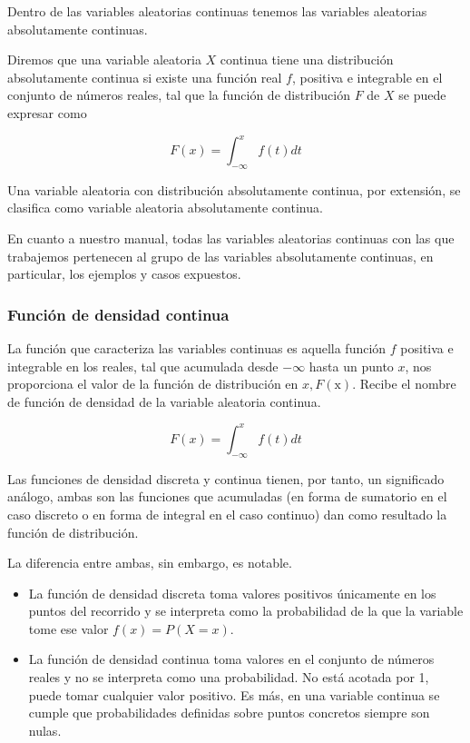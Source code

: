 \documentclass[
]{article}
\providecommand{\tightlist}{%
  \setlength{\itemsep}{0pt}\setlength{\parskip}{0pt}}
\begin{document}
Dentro de las variables aleatorias continuas tenemos las variables
aleatorias absolutamente continuas.

Diremos que una variable aleatoria \(X\) continua tiene una distribución
absolutamente continua si existe una función real \(f\), positiva e
integrable en el conjunto de números reales, tal que la función de
distribución \(F\) de \(X\) se puede expresar como

\[
F(x)=\int_{-\infty}^{x} f(t) d t
\]

Una variable aleatoria con distribución absolutamente continua, por
extensión, se clasifica como variable aleatoria absolutamente continua.

En cuanto a nuestro manual, todas las variables aleatorias continuas con
las que trabajemos pertenecen al grupo de las variables absolutamente
continuas, en particular, los ejemplos y casos expuestos.

\subsubsection{Función de densidad continua}\label{funciuxf3n-de-densidad-continua}

La función que caracteriza las variables continuas es aquella función
\(f\) positiva e integrable en los reales, tal que acumulada desde
\(-\infty\) hasta un punto \(x\), nos proporciona el valor de la función de
distribución en \(x, F(\mathrm{x})\). Recibe el nombre de función de
densidad de la variable aleatoria continua.

\[
F(x)=\int_{-\infty}^{x} f(t) d t
\]

Las funciones de densidad discreta y continua tienen, por tanto, un
significado análogo, ambas son las funciones que acumuladas (en forma de
sumatorio en el caso discreto o en forma de integral en el caso
continuo) dan como resultado la función de distribución.

La diferencia entre ambas, sin embargo, es notable.

\begin{itemize}
\tightlist
\item
  La función de densidad discreta toma valores positivos únicamente en
  los puntos del recorrido y se interpreta como la probabilidad de la
  que la variable tome ese valor \(f(x)=P(X=x)\).
\item
  La función de densidad continua toma valores en el conjunto de
  números reales y no se interpreta como una probabilidad. No está
  acotada por 1, puede tomar cualquier valor positivo. Es más, en una
  variable continua se cumple que probabilidades definidas sobre
  puntos concretos siempre son nulas.
\end{itemize}
\end{document}
